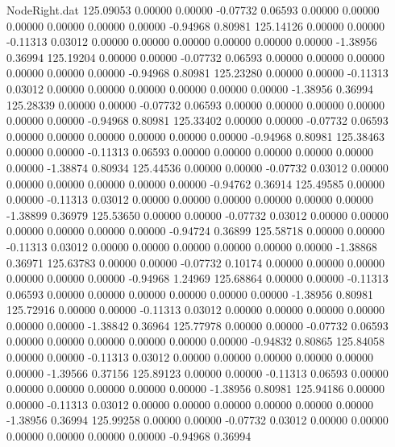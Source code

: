 \begin{filecontents}{NodeRight.dat}
 125.09053    0.00000    0.00000    -0.07732    0.06593    0.00000    0.00000    0.00000    0.00000    0.00000    0.00000   -0.94968    0.80981
 125.14126    0.00000    0.00000    -0.11313    0.03012    0.00000    0.00000    0.00000    0.00000    0.00000    0.00000   -1.38956    0.36994
 125.19204    0.00000    0.00000    -0.07732    0.06593    0.00000    0.00000    0.00000    0.00000    0.00000    0.00000   -0.94968    0.80981
 125.23280    0.00000    0.00000    -0.11313    0.03012    0.00000    0.00000    0.00000    0.00000    0.00000    0.00000   -1.38956    0.36994
 125.28339    0.00000    0.00000    -0.07732    0.06593    0.00000    0.00000    0.00000    0.00000    0.00000    0.00000   -0.94968    0.80981
 125.33402    0.00000    0.00000    -0.07732    0.06593    0.00000    0.00000    0.00000    0.00000    0.00000    0.00000   -0.94968    0.80981
 125.38463    0.00000    0.00000    -0.11313    0.06593    0.00000    0.00000    0.00000    0.00000    0.00000    0.00000   -1.38874    0.80934
 125.44536    0.00000    0.00000    -0.07732    0.03012    0.00000    0.00000    0.00000    0.00000    0.00000    0.00000   -0.94762    0.36914
 125.49585    0.00000    0.00000    -0.11313    0.03012    0.00000    0.00000    0.00000    0.00000    0.00000    0.00000   -1.38899    0.36979
 125.53650    0.00000    0.00000    -0.07732    0.03012    0.00000    0.00000    0.00000    0.00000    0.00000    0.00000   -0.94724    0.36899
 125.58718    0.00000    0.00000    -0.11313    0.03012    0.00000    0.00000    0.00000    0.00000    0.00000    0.00000   -1.38868    0.36971
 125.63783    0.00000    0.00000    -0.07732    0.10174    0.00000    0.00000    0.00000    0.00000    0.00000    0.00000   -0.94968    1.24969
 125.68864    0.00000    0.00000    -0.11313    0.06593    0.00000    0.00000    0.00000    0.00000    0.00000    0.00000   -1.38956    0.80981
 125.72916    0.00000    0.00000    -0.11313    0.03012    0.00000    0.00000    0.00000    0.00000    0.00000    0.00000   -1.38842    0.36964
 125.77978    0.00000    0.00000    -0.07732    0.06593    0.00000    0.00000    0.00000    0.00000    0.00000    0.00000   -0.94832    0.80865
 125.84058    0.00000    0.00000    -0.11313    0.03012    0.00000    0.00000    0.00000    0.00000    0.00000    0.00000   -1.39566    0.37156
 125.89123    0.00000    0.00000    -0.11313    0.06593    0.00000    0.00000    0.00000    0.00000    0.00000    0.00000   -1.38956    0.80981
 125.94186    0.00000    0.00000    -0.11313    0.03012    0.00000    0.00000    0.00000    0.00000    0.00000    0.00000   -1.38956    0.36994
 125.99258    0.00000    0.00000    -0.07732    0.03012    0.00000    0.00000    0.00000    0.00000    0.00000    0.00000   -0.94968    0.36994

\end{filecontents}
